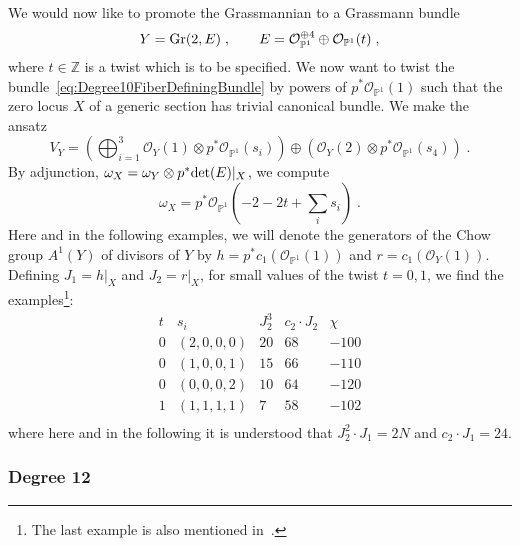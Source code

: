 \documentclass[11pt,a4paper]{article}
\numberwithin{equation}{section}
\numberwithin{table}{section}\setlength{\multlinegap}{25pt}
\begin{document}
We would now like to promote the Grassmannian to a Grassmann bundle
\begin{equation}
    Y = \textup{Gr}(2,E)\;,\qquad E = \mathcal{O}_{\mathbb{P}^1}^{\oplus 4}\oplus \mathcal{O}_{\mathbb{P}^1}(t)\;,
\end{equation}
where $t\in \mathbb{Z}$ is a twist which is to be specified. We now want to twist the bundle~\eqref{eq:Degree10FiberDefiningBundle} by powers of $p^*\mathcal{O}_{\mathbb{P}^1}(1)$ such that the zero locus $X$ of a generic section has trivial canonical bundle. We make the ansatz
\begin{equation}
    V_Y = \left(\bigoplus_{i=1}^{3}\mathcal{O}_Y(1)\otimes p^*\mathcal{O}_{\mathbb{P}^1}(s_i)\right)\oplus\left(\mathcal{O}_Y(2)\otimes p^*\mathcal{O}_{\mathbb{P}^1}(s_4)\right)\;.
\end{equation}
By adjunction, $\omega_X=\omega_Y\otimes p^*\textup{det}(E)|_X$, we compute
\begin{equation}
    \omega_X=p^*\mathcal{O}_{\mathbb{P}^1}(-2-2t+\textstyle{\sum}_i s_i)\;.
\end{equation}
Here and in the following examples, we will denote the generators of the Chow group $A^1(Y)$ of divisors of $Y$ by $h=p^*c_1(\mathcal{O}_{\mathbb{P}^1}(1))$ and $r=c_1(\mathcal{O}_Y(1))$. Defining $J_1=h|_X$ and $J_2=r|_X$, for small values of the twist $t=0,1$, we find the examples\footnote{The last example is also mentioned in~\cite{Knapp:2021vkm}.}:
\begin{equation}
    \begin{array}{ccccc}
        t & s_i & J_2^3 & c_2\cdot J_2 & \chi\\
        \hline
        0 & (2,0,0,0) & 20 & 68 & -100\\
        0 & (1,0,0,1) & 15 & 66 & -110\\
        0 & (0,0,0,2) & 10 & 64 & -120\\
        1 & (1,1,1,1) & 7 & 58 & -102\\
    \end{array}
\end{equation}
where here and in the following it is understood that $J_2^2\cdot J_1=2N$ and $c_2\cdot J_1=24$.


\subsubsection*{Degree 12}
\end{document}
